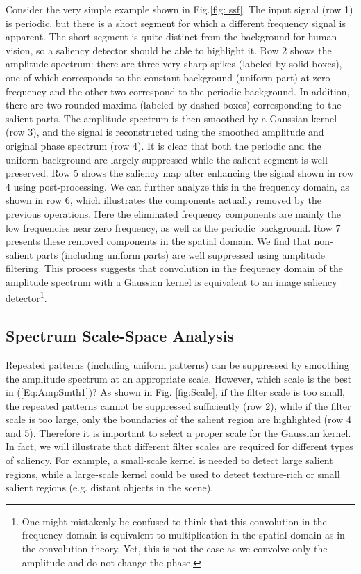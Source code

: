 \documentclass[10pt,journal,cspaper,compsoc]{IEEEtran}
\begin{document}
Consider the very simple example shown in Fig.\ref{fig: ssf}. The input signal (row 1) is periodic, but there is a short segment for which a different frequency signal is apparent. The short segment is quite distinct from the background for human vision, so a saliency detector should be able to highlight it. Row 2 shows the amplitude spectrum: there are three very sharp spikes (labeled by solid boxes), one of which corresponds to the constant background (uniform part) at zero frequency and the other two correspond to the periodic background. In addition, there are two rounded maxima (labeled by dashed boxes) corresponding to the salient parts. The amplitude spectrum is then smoothed by a Gaussian kernel (row 3), and the signal is reconstructed using the smoothed amplitude and original phase spectrum (row 4). It is clear that both the periodic and the uniform background are largely suppressed while the salient segment is well preserved. Row 5 shows the saliency map after enhancing the signal shown in row 4 using post-processing. We can further analyze this in the frequency domain, as shown in row 6, which illustrates the components actually removed by the previous operations. Here the eliminated frequency components are mainly the low frequencies near zero frequency, as well as the periodic background. Row 7 presents these removed components in the spatial domain. We find that non-salient parts (including uniform parts) are well suppressed using amplitude filtering. This process suggests that convolution in the frequency domain of the amplitude spectrum with a Gaussian kernel is equivalent to an image saliency detector\footnote{One might mistakenly be confused to think that this convolution in the frequency domain is equivalent to multiplication in the spatial domain as in the convolution theory. Yet, this is not the case as we convolve only the amplitude and do not change the phase.}.


\subsection{Spectrum Scale-Space Analysis}
\label{sec:SSSA}

Repeated patterns (including uniform patterns) can be suppressed by smoothing the amplitude spectrum at an appropriate scale. However, which scale is the best in (\ref{Eq:AmpSmth1})? As shown in Fig. \ref{fig:Scale}, if the filter scale is too small, the repeated patterns cannot be suppressed sufficiently (row 2), while if the filter scale is too large, only the boundaries of the salient region are highlighted (row 4 and 5). Therefore it is important to select a proper scale for the Gaussian kernel. In fact, we will illustrate that different filter scales are required for different types of saliency. For example, a small-scale kernel is needed to detect large salient regions, while a large-scale kernel could be used to detect texture-rich or small salient regions (e.g. distant objects in the scene).
\end{document}
